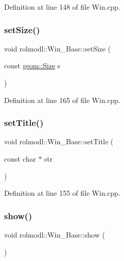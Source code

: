 Definition at line 148 of file Win.\+cpp.

\mbox{\label{classrolmodl_1_1_win___base_ad492295ad89ac5f8eef7f9e70b3b3afd}} 
\subsubsection{\texorpdfstring{setSize()}{setSize()}}
{\footnotesize\ttfamily void rolmodl\+::\+Win\+\_\+\+Base\+::set\+Size (\begin{DoxyParamCaption}\item[{const \mbox{\hyperlink{structrolmodl_1_1geom_1_1_size}{geom\+::\+Size}}}]{s }\end{DoxyParamCaption})\hspace{0.3cm}{\ttfamily [noexcept]}}



Definition at line 165 of file Win.\+cpp.

\mbox{\label{classrolmodl_1_1_win___base_a2df336b4c6994db0a40fd96629e0f3af}} 
\subsubsection{\texorpdfstring{setTitle()}{setTitle()}}
{\footnotesize\ttfamily void rolmodl\+::\+Win\+\_\+\+Base\+::set\+Title (\begin{DoxyParamCaption}\item[{const char $\ast$}]{str }\end{DoxyParamCaption})\hspace{0.3cm}{\ttfamily [noexcept]}}



Definition at line 155 of file Win.\+cpp.

\mbox{\label{classrolmodl_1_1_win___base_a5592cfca6b80670f2a3517cc77852b8f}} 
\subsubsection{\texorpdfstring{show()}{show()}}
{\footnotesize\ttfamily void rolmodl\+::\+Win\+\_\+\+Base\+::show (\begin{DoxyParamCaption}{ }\end{DoxyParamCaption})\hspace{0.3cm}{\ttfamily [noexcept]}}



